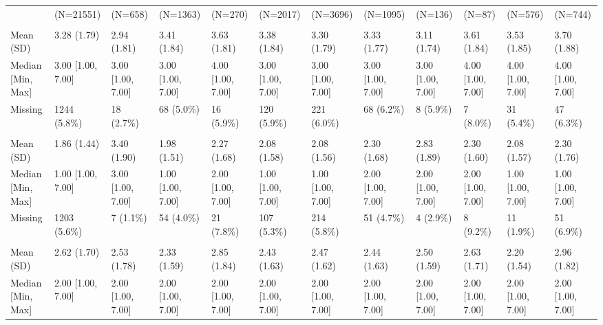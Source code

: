 \documentclass[
  single column]{article}
\begin{document}
\begin{landscape}
\begin{longtable}[t]{llllllllllll}
\endfoot
\bottomrule
\endlastfoot
 & (N=21551) & (N=658) & (N=1363) & (N=270) & (N=2017) & (N=3696) & (N=1095) & (N=136) & (N=87) & (N=576) & (N=744)\\
\addlinespace[0.3em]
\multicolumn{12}{l}{\textbf{Perceived Age Discrimination}}\\
\hspace{1em}Mean (SD) & 3.28 (1.79) & 2.94 (1.81) & 3.41 (1.84) & 3.63 (1.81) & 3.38 (1.84) & 3.30 (1.79) & 3.33 (1.77) & 3.11 (1.74) & 3.61 (1.84) & 3.53 (1.85) & 3.70 (1.88)\\
\hspace{1em}Median [Min, Max] & 3.00 [1.00, 7.00] & 3.00 [1.00, 7.00] & 3.00 [1.00, 7.00] & 4.00 [1.00, 7.00] & 3.00 [1.00, 7.00] & 3.00 [1.00, 7.00] & 3.00 [1.00, 7.00] & 3.00 [1.00, 7.00] & 4.00 [1.00, 7.00] & 4.00 [1.00, 7.00] & 4.00 [1.00, 7.00]\\
\hspace{1em}Missing & 1244 (5.8\%) & 18 (2.7\%) & 68 (5.0\%) & 16 (5.9\%) & 120 (5.9\%) & 221 (6.0\%) & 68 (6.2\%) & 8 (5.9\%) & 7 (8.0\%) & 31 (5.4\%) & 47 (6.3\%)\\
\addlinespace[0.3em]
\multicolumn{12}{l}{\textbf{Perceived Ethnic Discrimination}}\\
\hspace{1em}Mean (SD) & 1.86 (1.44) & 3.40 (1.90) & 1.98 (1.51) & 2.27 (1.68) & 2.08 (1.58) & 2.08 (1.56) & 2.30 (1.68) & 2.83 (1.89) & 2.30 (1.60) & 2.08 (1.57) & 2.30 (1.76)\\
\hspace{1em}Median [Min, Max] & 1.00 [1.00, 7.00] & 3.00 [1.00, 7.00] & 1.00 [1.00, 7.00] & 2.00 [1.00, 7.00] & 1.00 [1.00, 7.00] & 1.00 [1.00, 7.00] & 2.00 [1.00, 7.00] & 2.00 [1.00, 7.00] & 2.00 [1.00, 7.00] & 1.00 [1.00, 7.00] & 1.00 [1.00, 7.00]\\
\hspace{1em}Missing & 1203 (5.6\%) & 7 (1.1\%) & 54 (4.0\%) & 21 (7.8\%) & 107 (5.3\%) & 214 (5.8\%) & 51 (4.7\%) & 4 (2.9\%) & 8 (9.2\%) & 11 (1.9\%) & 51 (6.9\%)\\
\addlinespace[0.3em]
\multicolumn{12}{l}{\textbf{Perceived Gender Discrimination}}\\
\hspace{1em}Mean (SD) & 2.62 (1.70) & 2.53 (1.78) & 2.33 (1.59) & 2.85 (1.84) & 2.43 (1.63) & 2.47 (1.62) & 2.44 (1.63) & 2.50 (1.59) & 2.63 (1.71) & 2.20 (1.54) & 2.96 (1.82)\\
\hspace{1em}Median [Min, Max] & 2.00 [1.00, 7.00] & 2.00 [1.00, 7.00] & 2.00 [1.00, 7.00] & 2.00 [1.00, 7.00] & 2.00 [1.00, 7.00] & 2.00 [1.00, 7.00] & 2.00 [1.00, 7.00] & 2.00 [1.00, 7.00] & 2.00 [1.00, 7.00] & 2.00 [1.00, 7.00] & 2.00 [1.00, 7.00]\\

\end{longtable}
\end{landscape}
\end{document}

